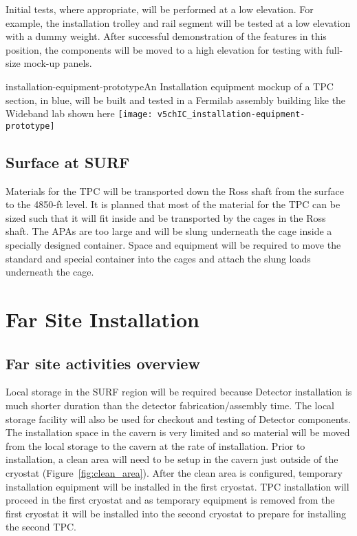 Initial tests, where appropriate, will be performed at a low elevation. For example, the installation trolley 
and rail segment will be tested at a low elevation with a dummy weight. After successful demonstration of the features in this position, the components will be moved to a high elevation for testing with full-
size mock-up panels. 

\begin{cdrfigure}{installation-equipment-prototype}{An Installation equipment mockup of a TPC section, in blue, will be built and tested in a Fermilab assembly building like the Wideband lab shown here}
\texttt{[image: v5chIC\_installation-equipment-prototype]}
\end{cdrfigure}


\subsection{Surface at SURF}
\label{fd:install:tempeqp:surfsurface}

Materials for the TPC will be transported down the Ross shaft from the surface to the 4850-ft level.  It is planned that most of the material for the TPC can be sized such that it will fit inside and be transported by the cages in the Ross shaft.  The APAs are too large and will be slung underneath the cage inside a specially designed container.  Space and equipment will be required to move the standard and special container into the cages and attach the slung loads underneath the cage.  

\section{Far Site Installation}
\label{fd:install:fsinstall}

\subsection{Far site activities overview}
\label{fd:install:fsactivities}

Local storage in the SURF region will be required because Detector installation is much shorter duration than the detector fabrication/assembly time. The local storage facility will also be used for checkout and 
testing of Detector components. The installation space in the cavern is very limited and so material will be moved from the local storage to the cavern at the rate of installation. Prior to installation, a clean area 
will need to be setup in the cavern just outside of the cryostat (Figure~\ref{fig:clean_area}). After the clean area is configured, temporary installation equipment will be installed in the first cryostat. TPC installation will proceed in the 
first cryostat and as temporary equipment is removed from the first cryostat it will be installed into the second cryostat to prepare for installing the second TPC.

